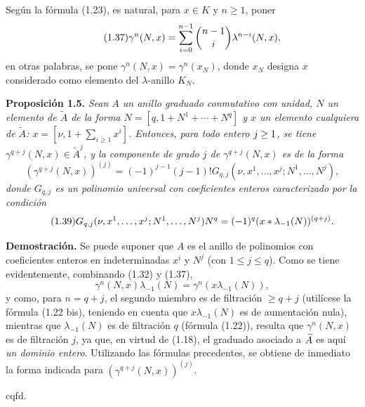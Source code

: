 Según la fórmula (1.23), es natural, para $x\in K$ y $n\geq1$, poner
\begin{equation}\tag{1.37}
\gamma^n(N,x)=\sum_{i=0}^{n-1}\binom{n-1}{i}\lambda^{\sisi{i}{n-i}}(N,x),
\end{equation}
en otras palabras, se pone $\gamma^n(N,x)=\gamma^n(x_N)$, donde $x_N$ designa $x$ considerado como elemento del $\lambda$-anillo $K_N$.

\textbf{Proposición 1.5.} \emph{Sean $A$ un anillo graduado conmutativo con unidad, $N$ un elemento de $\widetilde A$ de la forma $N=[q,1+N^1+\cdots+N^q]$ y $x$ un elemento cualquiera de $\widetilde A$: $x=[\nu,1+\sum_{i\geq1}x^i]$. Entonces, para todo entero $\sisi{j\geq0}{j\geq1}$, se tiene $\gamma^{q+j}(N,x)\in\widetilde A^j$, y la componente de grado $j$ de $\gamma^{q+j}(N,x)$ es de la forma}
\begin{equation}\tag{1.38}
\left(\gamma^{q+j}(N,x)\right)^{(j)}=(-1)^{j-1}(j-1)!G_{q,j}(\nu,x^1,\ldots,x^j;N^1,\ldots,N^j),
\end{equation}
\emph{donde $G_{q,j}$ es un polinomio universal con coeficientes enteros caracterizado por la condición}
\begin{equation}\tag{1.39}
\sisi{G_{q,j}(\nu,x^1,\ldots,N^j)}{G_{q,j}(\nu,x^1,\ldots,x^j;N^1,\ldots,N^j)}N^q=(-1)^q(x*\lambda_{-1}(N))^{(q+j)}.
\end{equation}

\textbf{Demostración.} Se puede suponer que $A$ es el anillo de polinomios con coeficientes enteros en indeterminadas $x^i$ y $N^j$ (con $1\leq j\leq q$). Como se tiene evidentemente, combinando (1.32) y (1.37),
\begin{equation}\tag{1.40}
\gamma^n(N,x)\lambda_{-1}(N)=\gamma^n(x\lambda_{-1}(N)),
\end{equation}
y como, para $n=q+j$, el segundo miembro es de filtración $\geq q+j$ (utilícese la fórmula (1.22 bis), teniendo en cuenta que $x\lambda_{-1}(N)$ es de aumentación nula), mientras que $\lambda_{-1}(N)$ es de filtración $q$ (fórmula (1.22)), resulta que $\gamma^n(N,x)$ es de filtración $j$, ya que, en virtud de (1.18), el graduado asociado a $\sisi{A}{\widetilde A}$ es aquí \emph{un dominio entero}. Utilizando las fórmulas precedentes, se obtiene de inmediato la forma indicada para $(\gamma^{q+j}(N,x))^{(j)}$.
\begin{flushright}cqfd.\end{flushright}
